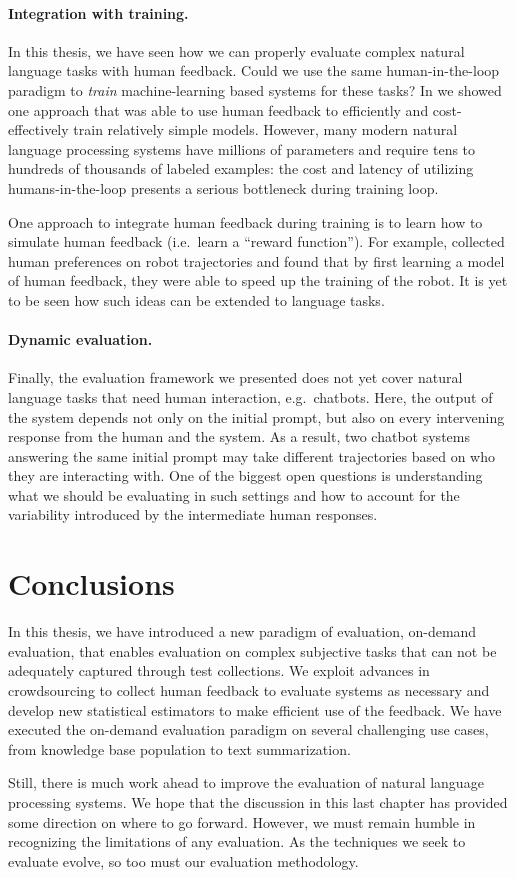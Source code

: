 \paragraph{Integration with training.}
In this thesis, we have seen how we can properly evaluate complex natural language tasks with human feedback.
Could we use the same human-in-the-loop paradigm to \textit{train} machine-learning based systems for these tasks?
In  we showed one approach that was able to use human feedback to efficiently and cost-effectively train relatively simple models.
However, many modern natural language processing systems have millions of parameters and require tens to hundreds of thousands of labeled examples:
  the cost and latency of utilizing humans-in-the-loop presents a serious bottleneck during training loop.

One approach to integrate human feedback during training is to learn how to simulate human feedback (i.e.\ learn a ``reward function'').
For example, \citet{christiano2017deep} collected human preferences on robot trajectories and found that by first learning a model of human feedback, they were able to speed up the training of the robot.
It is yet to be seen how such ideas can be extended to language tasks.

\paragraph{Dynamic evaluation.}
Finally, the evaluation framework we presented does not yet cover natural language tasks that need human interaction, e.g.\ chatbots.
Here, the output of the system depends not only on the initial prompt, but also on every intervening response from the human and the system.
As a result, two chatbot systems answering the same initial prompt may take different trajectories based on who they are interacting with.
One of the biggest open questions is understanding what we should be evaluating in such settings and how to account for the variability introduced by the intermediate human responses.

\section{Conclusions}
In this thesis, we have introduced a new paradigm of evaluation, on-demand evaluation, that enables evaluation on complex subjective  tasks that can not be adequately captured through test collections.
We exploit advances in crowdsourcing to collect human feedback to evaluate systems as necessary and develop new statistical estimators to make efficient use of the feedback.
We have executed the on-demand evaluation paradigm on several challenging use cases, from knowledge base population to text summarization.

Still, there is much work ahead to improve the evaluation of natural language processing systems.
We hope that the discussion in this last chapter has provided some direction on where to go forward.
However, we must remain humble in recognizing the limitations of any evaluation.
As the techniques we seek to evaluate evolve, so too must our evaluation methodology.
